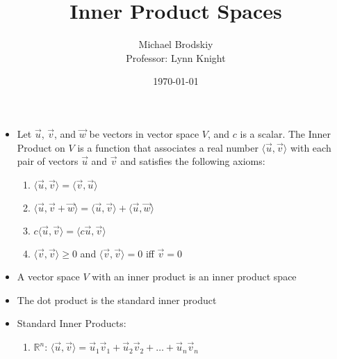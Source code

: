 \documentclass[12pt]{article}
\title{Inner Product Spaces}
\date{\today}
\author{Michael Brodskiy\\ \small Professor: Lynn Knight}
\begin{document}
\maketitle

\begin{itemize}

  \item Let $\overrightarrow{u}$, $\overrightarrow{v}$, and $\overrightarrow{w}$ be vectors in vector space $V$, and $c$ is a scalar. The Inner Product on $V$ is a function that associates a real number $\langle \overrightarrow{u},\overrightarrow{v}\rangle$ with each pair of vectors $\overrightarrow{u}$ and $\overrightarrow{v}$ and satisfies the following axioms:

    \begin{enumerate}

      \item $\langle\overrightarrow{u},\overrightarrow{v}\rangle=\langle\overrightarrow{v},\overrightarrow{u}\rangle$

      \item $\langle\overrightarrow{u},\overrightarrow{v}+\overrightarrow{w}\rangle=\langle\overrightarrow{u},\overrightarrow{v}\rangle + \langle\overrightarrow{u},\overrightarrow{w}\rangle$

      \item $c\langle\overrightarrow{u},\overrightarrow{v}\rangle=\langle c\overrightarrow{u},\overrightarrow{v}\rangle$

      \item $\langle \overrightarrow{v},\overrightarrow{v}\rangle\geq0$ and $\langle\overrightarrow{v},\overrightarrow{v}\rangle=0$ iff $\overrightarrow{v}=0$

    \end{enumerate}

  \item A vector space $V$ with an inner product is an inner product space

  \item The dot product is the standard inner product

  \item Standard Inner Products:

    \begin{enumerate}

      \item $\mathbb{R}^n$: $\langle\overrightarrow{u},\overrightarrow{v}\rangle=\overrightarrow{u}_1\overrightarrow{v}_1+\overrightarrow{u}_2\overrightarrow{v}_2+\dots+\overrightarrow{u}_n\overrightarrow{v}_n$


\end{enumerate}
\end{itemize}
\end{document}
